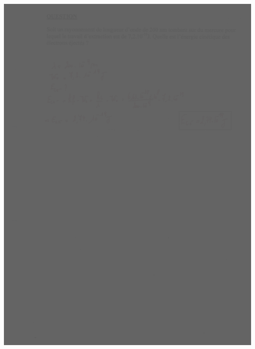 {\includegraphics[width=17.498cm,height=24.13cm]{Pictures/10000001000002570000033B2EDAF7105EA9C179.png}

}
